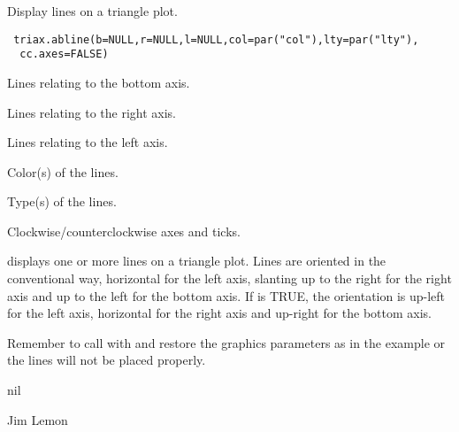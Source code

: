 \begin{Description}\relax
Display lines on a triangle plot.
\end{Description}
\begin{Usage}
\begin{verbatim}
 triax.abline(b=NULL,r=NULL,l=NULL,col=par("col"),lty=par("lty"),
  cc.axes=FALSE)
\end{verbatim}
\end{Usage}
\begin{Arguments}
\begin{ldescription}
\item[\code{b}] Lines relating to the bottom axis.
\item[\code{r}] Lines relating to the right axis.
\item[\code{l}] Lines relating to the left axis.
\item[\code{col}] Color(s) of the lines.
\item[\code{lty}] Type(s) of the lines.
\item[\code{cc.axes}] Clockwise/counterclockwise axes and ticks.
\end{ldescription}
\end{Arguments}
\begin{Details}\relax
{} displays one or more lines on a triangle plot. Lines
are oriented in the conventional way, horizontal for the left axis, 
slanting up to the right for the right axis and up to the left for the 
bottom axis. If  is TRUE, the orientation is up-left for
the left axis, horizontal for the right axis and up-right for the bottom
axis.

Remember to call  with  and restore
the graphics parameters as in the example or the lines will not be
placed properly.
\end{Details}
\begin{Value}
nil
\end{Value}
\begin{Author}\relax
Jim Lemon
\end{Author}
\begin{SeeAlso}\relax
{}
\end{SeeAlso}
\begin{Examples}
\end{Examples}

